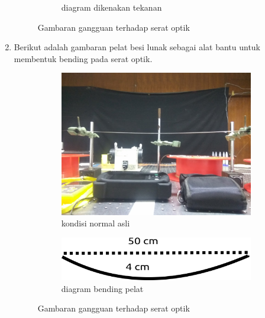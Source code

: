 \documentclass[12pt]{article}
\begin{document}
\begin{enumerate}
\begin{figure}[!h]
\begin{subfigure}[b]{0.3\textwidth}
				\caption{\small{diagram dikenakan tekanan}}			
			\end{subfigure}
			\caption[Uji Peturbasi]{\small{Gambaran gangguan terhadap serat optik}}
		\end{figure}
		
		\item Berikut adalah gambaran pelat besi lunak sebagai alat bantu untuk membentuk bending pada serat optik.
		
		\begin{figure}[!h]
			\centering
			\captionsetup{justification=centering}
			\begin{subfigure}[b]{0.2\textwidth}
				\includegraphics[width=\textwidth]{images/Bab_4/Bab_4_2a}	
				\caption{\small{kondisi normal asli}}		
			\end{subfigure}
			\begin{subfigure}[b]{0.2\textwidth}
				\includegraphics[width=\linewidth]{images/Bab_4/Bab_4_2b}
				\caption{\small{diagram bending pelat}}			
			\end{subfigure}
			\caption[Uji Peturbasi]{\small{Gambaran gangguan terhadap serat optik }}
		\end{figure}
		
	\end{enumerate}
	
\end{document}
